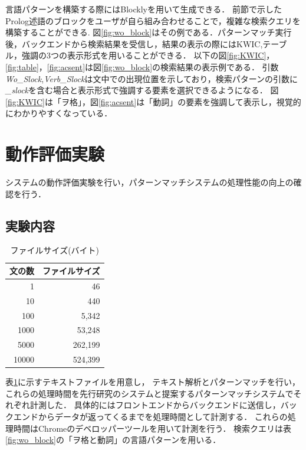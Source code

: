 \documentclass{FITpaper}
\begin{document}
言語パターンを構築する際にはBlocklyを用いて生成できる．
前節で示したProlog述語のブロックをユーザが自ら組み合わせることで，複雑な検索クエリを構築することができる.
図\ref{fig:wo_block}はその例である．パターンマッチ実行後，バックエンドから検索結果を受信し，結果の表示の際にはKWIC,テーブル，強調の3つの表示形式を用いることができる．
以下の図\ref{fig:KWIC}，\ref{fig:table}，\ref{fig:acsent}は図\ref{fig:wo_block}の検索結果の表示例である．
引数\textit{Wo\_Slock},\textit{Verb\_Slock}は文中での出現位置を示しており，検索パターンの引数に\textit{\_slock}を含む場合と表示形式で強調する要素を選択できるようになる．
図\ref{fig:KWIC}は「ヲ格」，図\ref{fig:acsent}は「動詞」の要素を強調して表示し，視覚的にわかりやすくなっている．




\section{動作評価実験}
システムの動作評価実験を行い，パターンマッチシステムの処理性能の向上の確認を行う．

\subsection{実験内容}
\begin{table}[htbp]
  \centering
    \caption{ファイルサイズ(バイト)}
    \label{tbl:txt}
    \begin{tabular}{|r||r|}  
      \hline
      文の数 & ファイルサイズ\\ \hline \hline
      1 & 46\\\hline
      10 & 440 \\\hline
      100 & 5,342\\ \hline
      1000 & 53,248 \\\hline
      5000 &  262,199 \\\hline
      10000 &  524,399\\ \hline
    \end{tabular}
  \end{table}

表\ref{tbl:txt}に示すテキストファイルを用意し，
テキスト解析とパターンマッチを行い，これらの処理時間を先行研究のシステムと提案するパターンマッチシステムでそれぞれ計測した．
具体的にはフロントエンドからバックエンドに送信し，バックエンドからデータが返ってくるまでを処理時間として計測する．
これらの処理時間はChromeのデベロッパーツールを用いて計測を行う．
検索クエリは表\ref{fig:wo_block}の「ヲ格と動詞」の言語パターンを用いる．
\end{document}
